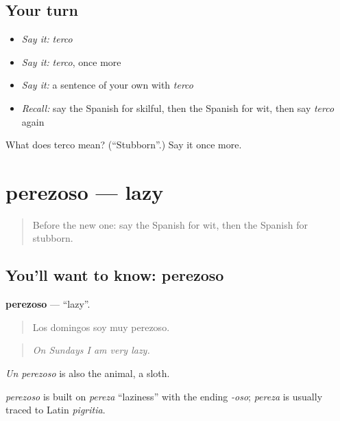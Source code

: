 \subsection*{Your turn}
\begin{itemize}
\raggedright
  \item \emph{Say it:} \emph{terco}
  \item \emph{Say it:} \emph{terco}, once more
  \item \emph{Say it:} a sentence of your own with \emph{terco}
  \item \emph{Recall:} say the Spanish for skilful, then the Spanish for wit, then say \emph{terco} again
\end{itemize}

\begin{tcolorbox}[breakable,colback=teal!4,colframe=teal!35!black,title={Before you move on}]
What does terco mean? (\textquotedblleft{}Stubborn\textquotedblright{}.) Say it once more.
\end{tcolorbox}
\section[perezoso]{perezoso — lazy}

\label{lesson:ES-C729-perezoso}



\begin{quote}
Before the new one: say the Spanish for wit, then the Spanish for stubborn.
\end{quote}

\subsection*{You'll want to know: perezoso}
\textbf{perezoso} — \textquotedblleft{}lazy\textquotedblright{}.

\begin{quote}
Los domingos soy muy perezoso.
\end{quote}

\begin{quote}
\emph{On Sundays I am very lazy.}
\end{quote}

\emph{Un perezoso} is also the animal, a sloth.

\begin{cousinweb}
\emph{perezoso} is built on \emph{pereza} \textquotedblleft{}laziness\textquotedblright{} with the ending \emph{-oso}; \emph{pereza} is usually traced to Latin \emph{pigritia}.
\end{cousinweb}

